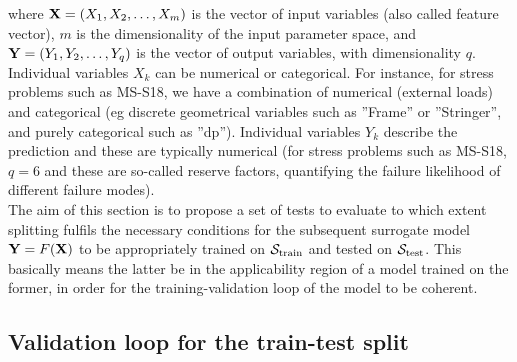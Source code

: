 where ${\bf X}=(X_1,X_2,\dots,X_m)$ is the vector of input variables (also called feature vector), $m$ is the dimensionality of the input parameter space, and ${\bf Y}=(Y_1,Y_2,\dots,Y_q)$ is the vector of output variables, with dimensionality $q$. Individual variables $X_k$ can be numerical or categorical. For instance, for stress problems such as MS-S18, we have a combination of numerical  (\eg external loads) and categorical (eg discrete geometrical variables such as ''Frame'' or ''Stringer'', and purely categorical such as ''dp''). Individual variables $Y_k$ describe the prediction and these are typically numerical (for stress problems such as MS-S18, $q=6$ and these are so-called reserve factors, quantifying the failure likelihood of different failure modes).\\
%
\indent The aim of this section is to propose a set of tests to evaluate to which extent splitting fulfils the necessary conditions for the subsequent surrogate model ${\bf {Y}}={F}({\bf X})$ to be appropriately trained on ${\cal S}_{\text{train}}$ and tested on ${\cal S}_{\text{test}}$. This basically means the latter be in the applicability region of a model trained on the former, in order for the training-validation loop of the model to be coherent.\\
%
\subsection{Validation loop for the train-test split}

